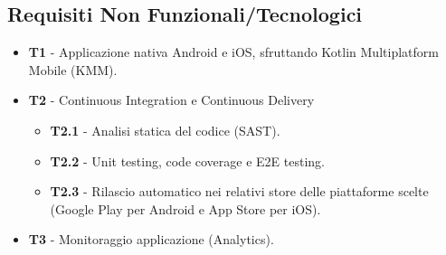 \subsection{Requisiti Non Funzionali/Tecnologici}
\begin{itemize}
    \item \textbf{T1} - Applicazione nativa Android e iOS, sfruttando Kotlin Multiplatform Mobile (KMM).
    \item \textbf{T2} - Continuous Integration e Continuous Delivery
    \begin{itemize}
        \item \textbf{T2.1} - Analisi statica del codice (SAST).
        \item \textbf{T2.2} - Unit testing, code coverage e E2E testing.
        \item \textbf{T2.3} - Rilascio automatico nei relativi store delle piattaforme scelte (Google Play per Android e App Store per iOS).
    \end{itemize}
    \item \textbf{T3} - Monitoraggio applicazione (Analytics).
\end{itemize}

